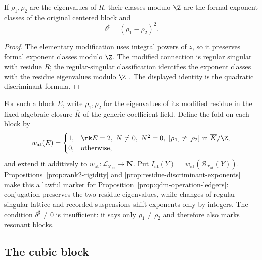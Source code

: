 \begin{proposition}
\label{prop:residue-discriminant-exponents}
%
%
%
If \(\rho_1,\rho_2\) are the eigenvalues of \(R\), their classes modulo
\(\Z\) are the formal exponent classes of the original centered block and
\[
 \delta^\sharp=(\rho_1-\rho_2)^2.
\]
\end{proposition}

\begin{proof}
The elementary modification uses integral powers of \(z\), so it preserves
formal exponent classes modulo \(\Z\).  The modified connection is regular
singular with residue \(R\); the regular-singular classification identifies
the exponent classes with the residue eigenvalues modulo \(\Z\)
\cite[Chapter~3]{PutSinger}.  The displayed identity is the quadratic
discriminant formula.
\end{proof}

For such a block \(E\), write \(\rho_1,\rho_2\) for the eigenvalues of its
modified residue in the
fixed algebraic closure \(\overline K\) of the generic coefficient field.
Define the fold on each block by
\begin{equation}
 w_{\mathrm{at}}(E)=
 \begin{cases}
 1,&\rk E=2,\ N\ne0,\ N^2=0,\
      [\rho_1]\ne[\rho_2]\text{ in }\overline K/\Z,\\
 0,&\text{otherwise},
 \end{cases}
 \label{eq:atomic-fold}
\end{equation}
and extend it additively to
\(w_{\mathrm{at}}:\mathcal L_{\mathcal T_{\mathrm{at}}}\to\mathbf N\).  Put
\(I_{\mathrm{at}}(Y)=
w_{\mathrm{at}}(\mathcal B_{\mathcal T_{\mathrm{at}}}(Y))\).
Propositions~\ref{prop:rank2-rigidity} and
\ref{prop:residue-discriminant-exponents} make this a lawful marker for
Proposition~\ref{prop:qdm-operation-ledgers}: conjugation preserves the two
residue eigenvalues, while changes of regular-singular lattice and recorded
suspensions shift exponents only by integers.  The condition
\(\delta^\sharp\ne0\) is insufficient: it says only
\(\rho_1\ne\rho_2\) and therefore also marks resonant blocks.

\subsection{The cubic block}
\label{subsec:shared-cubic-packet}

